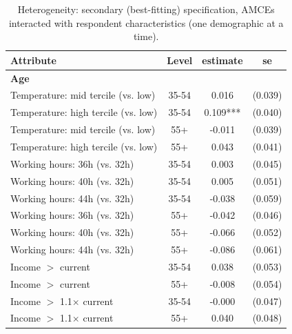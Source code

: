 \begin{table}[H]
    \centering
    \caption{Heterogeneity: secondary (best-fitting) specification, AMCEs interacted with respondent characteristics (one demographic at a time).}
    \begin{tabular}{ l c c c }
\hline \hline
Attribute & Level & estimate & se \\
\hline
\multicolumn{4}{l}{\textbf{Age}} \\
\hspace{0.05cm} Temperature: mid tercile (vs. low) & 35-54 & 0.016 & (0.039) \\
\hspace{0.05cm} Temperature: high tercile (vs. low) & 35-54 & 0.109*** & (0.040) \\
\hspace{0.05cm} Temperature: mid tercile (vs. low) & 55+ & -0.011 & (0.039) \\
\hspace{0.05cm} Temperature: high tercile (vs. low) & 55+ & 0.043 & (0.041) \\
\hspace{0.05cm} Working hours: 36h (vs. 32h) & 35-54 & 0.003 & (0.045) \\
\hspace{0.05cm} Working hours: 40h (vs. 32h) & 35-54 & 0.005 & (0.051) \\
\hspace{0.05cm} Working hours: 44h (vs. 32h) & 35-54 & -0.038 & (0.059) \\
\hspace{0.05cm} Working hours: 36h (vs. 32h) & 55+ & -0.042 & (0.046) \\
\hspace{0.05cm} Working hours: 40h (vs. 32h) & 55+ & -0.066 & (0.052) \\
\hspace{0.05cm} Working hours: 44h (vs. 32h) & 55+ & -0.086 & (0.061) \\
\hspace{0.05cm} Income $>$ current & 35-54 & 0.038 & (0.053) \\
\hspace{0.05cm} Income $>$ current & 55+ & -0.008 & (0.054) \\
\hspace{0.05cm} Income $>$ 1.1$\times$ current & 35-54 & -0.000 & (0.047) \\
\hspace{0.05cm} Income $>$ 1.1$\times$ current & 55+ & 0.040 & (0.048) \\

\end{tabular}
\end{table}

